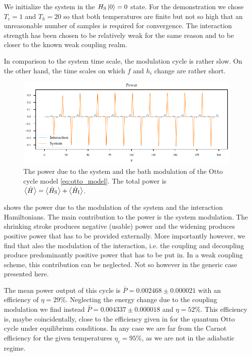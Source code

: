 We initialize the system in the \(H_{\mathrm{S}}\ket{0}=0\) state.  For the
demonstration we chose \(T_{c}=1\) and \(T_{h}=20\) so that both
temperatures are finite but not so high that an unreasonable number of
samples is required for convergence. The interaction strength has been
chosen to be relatively weak for the same reason and to be closer to
the known weak coupling realm.

In comparison to the system time scale, the modulation cycle is rather
slow. On the other hand, the time scales on which \(f\) and \(h_{i}\)
change are rather short.

\begin{figure}[ht]
  \centering
  \includegraphics{figs/otto/power}
  \caption{\label{fig:ottopower} The power due to the system and the
    bath modulation of the Otto cycle model \cref{eq:otto_model}. The
    total power is
    \(\ev{\dot{H}} = \ev{\dot{H}_{\sys}} + \ev{\dot{H}_{\inter}}\). }
\end{figure}
 shows the power due to the modulation of the
system and the interaction Hamiltonians. The main contribution to the
power is the system modulation. The shrinking stroke produces negative
(usable) power and the widening produces positive power that has to be
provided externally. More importantly however, we find that also the
modulation of the interaction, i.e. the coupling and decoupling
produce predominantly positive power that has to be put in. In a weak
coupling scheme, this contribution can be neglected. Not so however in
the generic case presented here.

The mean power output of this cycle is
\(\bar{P}=0.002468\pm 0.000021\) with an efficiency of
\(η=29\%\). Neglecting the energy change due to the coupling
modulation we find instead \(\bar{P}=0.004337\pm 0.000018\) and
\(η=52\%\).  This efficiency is, maybe coincidentally, close to the
efficiency given in \cite{Geva1992Feb} for the quantum Otto cycle
under equilibrium conditions. In any case we are far from the Carnot
efficiency for the given temperatures \(η_{c}=95\%\), as we are not in
the adiabatic regime.

